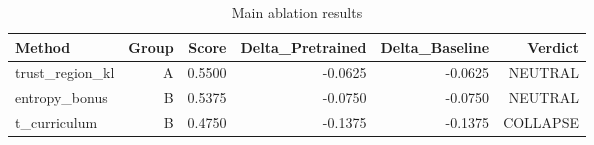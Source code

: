 \begin{table}[htbp]
\centering
\caption{Main ablation results}
\label{tab:main-results}
\begin{tabular}{lrrrrr}
\toprule
\textbf{Method} & \textbf{Group} & \textbf{Score} & \textbf{Delta\_Pretrained} & \textbf{Delta\_Baseline} & \textbf{Verdict} \\
\midrule
trust\_region\_kl & A & 0.5500 & -0.0625 & -0.0625 & NEUTRAL \\
entropy\_bonus & B & 0.5375 & -0.0750 & -0.0750 & NEUTRAL \\
t\_curriculum & B & 0.4750 & -0.1375 & -0.1375 & COLLAPSE \\
\bottomrule
\end{tabular}
\end{table}